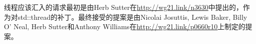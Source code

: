 

线程应该汇入的请求最初是由Herb Sutter在\url{http://wg21.link/n3630}中提出的，作为对std::thread的补丁。最终接受的提案是由Nicolai Josuttis, Lewis Baker, Billy O' Neal, Herb Sutter和Anthony Williams在\url{http://wg21.link/p0660r10}上制定的提案。